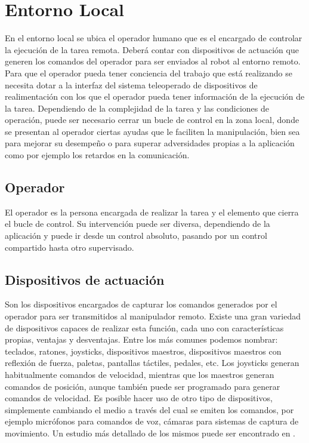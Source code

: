 \section*{Entorno Local}
En el entorno local se ubica el operador humano que es el encargado de controlar la ejecución de la tarea remota. Deberá contar con dispositivos de actuación que generen los comandos del operador para ser enviados al robot al entorno remoto. Para que el operador pueda tener conciencia del trabajo que está realizando se necesita dotar a la interfaz del sistema teleoperado de dispositivos de realimentación con los que el operador pueda tener información de la ejecución de la tarea. Dependiendo de la complejidad de la tarea y las condiciones de operación, puede ser necesario cerrar un bucle de control en la zona local, donde se presentan al operador ciertas ayudas que le faciliten la manipulación, bien sea para mejorar su desempeño o para superar adversidades propias a la aplicación como por ejemplo los retardos en la comunicación.




\subsection*{Operador}
El operador es la persona encargada de realizar la tarea y el elemento que cierra el bucle de control. Su intervención puede ser diversa, dependiendo de la aplicación y puede ir desde un control absoluto, pasando por un control compartido hasta otro supervisado.




\subsection*{Dispositivos de actuación}
Son los dispositivos encargados de capturar los comandos generados por el operador para ser transmitidos al manipulador remoto. Existe una gran variedad de dispositivos capaces de realizar esta función, cada uno con características propias, ventajas y desventajas. Entre los más comunes podemos nombrar: teclados, ratones, joysticks, dispositivos maestros, dispositivos maestros con reflexión de fuerza, paletas, pantallas táctiles, pedales, etc. Los joysticks generan habitualmente comandos de velocidad, mientras que los maestros generan comandos de posición, aunque también puede ser programado para generar comandos de velocidad. Es posible hacer uso de otro tipo de dispositivos, simplemente cambiando el medio a través del cual se emiten los comandos, por ejemplo micrófonos para comandos de voz, cámaras para sistemas de captura de movimiento. Un estudio más detallado de los mismos puede ser encontrado en \cite{Ferre2007a}.


